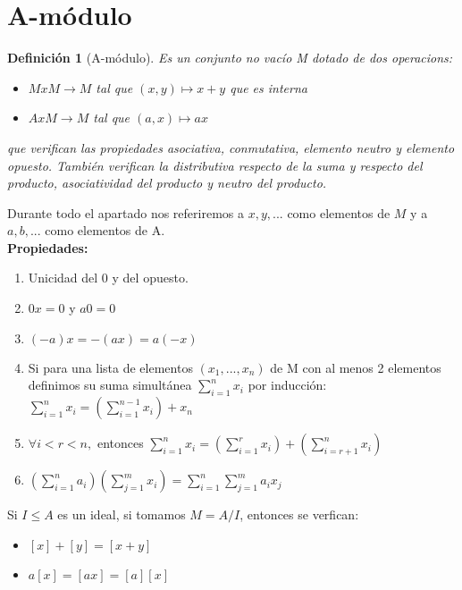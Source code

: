 \documentclass[11pt, a4paper, titlepage]{article}
\theoremstyle{theorem-style}
\theoremstyle{definition-style}
\newtheorem*{ndef}{Definición}
\theoremstyle{remark-style}
\theoremstyle{example-style}
\newenvironment{nlist}
{\begin{enumerate}
\renewcommand\labelenumi{(\emph{\roman{enumi})}}}
{\end{enumerate}}
\begin{document}
\section{A-módulo}
\begin{ndef}[A-módulo]
	Es un conjunto no vacío M dotado de dos operacions:
	\begin{itemize}
	\item $MxM \to M$ tal que $(x,y) \mapsto x+y$ que es interna
	\item $Ax M \to M$ tal que $(a,x) \mapsto ax$
\end{itemize}
que verifican las propiedades asociativa, conmutativa, elemento neutro y elemento opuesto. También verifican la distributiva respecto de la suma y respecto del producto, asociatividad del producto y neutro del producto.

\end{ndef}
Durante todo el apartado nos referiremos a $x, y,...$ como elementos de $M$ y a $a, b, ...$ como elementos de A.\\
\textbf{Propiedades:}
\begin{nlist}
	\item Unicidad del 0 y del opuesto.
	\item $0x = 0$ y $a0 = 0$
	\item $(-a)x = -(ax) = a(-x)$
	\item Si para una lista de elementos $(x_1,...,x_n)$ de M con al menos 2 elementos definimos su suma simultánea $\sum_{i=1}^n x_i$ por inducción:$ \sum_{i=1}^n x_i = (\sum_{i=1}^{n-1}x_i) +x_n$
	\item $\forall i < r < n,$ entonces $\sum_{i=1}^n x_i = (\sum_{i=1}^{r}x_i) + (\sum_{i=r+1}^{n}x_i) $
	\item $ (\sum_{i=1}^n a_i)(\sum_{j=1}^m x_i) = \sum_{i=1}^n \sum_{j=1}^m a_ix_j$
\end{nlist}

Si $I \leq A$ es un ideal, si tomamos $M= A/I$, entonces se verfican:
\begin{itemize}
	\item $[x]+[y] = [x+y]$
	\item $a[x] = [ax] = [a][x]$
\end{itemize}
\end{document}
